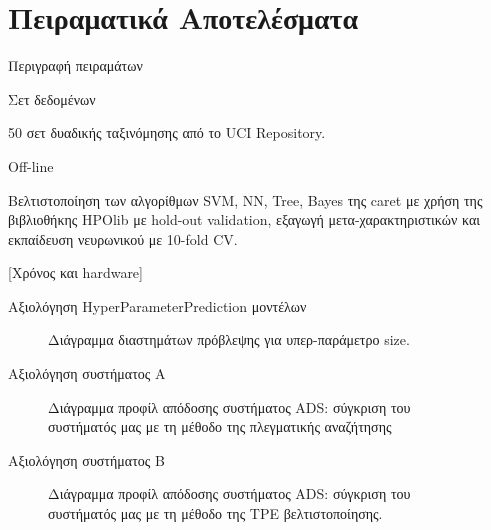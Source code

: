 \documentclass{beamer}
\begin{document}
   \section{Πειραματικά Αποτελέσματα}
  \begin{frame}{Περιγραφή πειραμάτων}
  	\begin{minipage}[t]{.3\textwidth}  		
  		Σετ δεδομένων
  		\vspace{4ex}
  	\end{minipage}%
  	\begin{minipage}[t]{.6\textwidth}
  		50 σετ δυαδικής ταξινόμησης από το UCI Repository.  		  	
  		\vspace{4ex}
  	\end{minipage}
  	\begin{minipage}[t]{.3\textwidth}  		
  		Off-line
  		\vspace{4ex}
  	\end{minipage}%
  	\begin{minipage}[t]{.6\textwidth}
  		Βελτιστοποίηση των αλγορίθμων SVM, NN, Tree, Bayes της caret με χρήση της βιβλιοθήκης HPOlib με hold-out validation, εξαγωγή μετα-χαρακτηριστικών και εκπαίδευση νευρωνικού με 10-fold CV.
  		
  		
  		[Χρόνος και hardware]
  		\vspace{4ex} 
  	\end{minipage} 
  \end{frame}
  \begin{frame}{Αξιολόγηση HyperParameterPrediction μοντέλων} 
  	\begin{figure}[!htb]
  		\scalebox{0.5}{
  			}
  		\caption{ \small Διάγραμμα διαστημάτων πρόβλεψης για υπερ-παράμετρο size.}
  	\end{figure}
  \end{frame}
  \begin{frame}{Αξιολόγηση συστήματος A} 
  	\begin{figure}[!htb]
  		\scalebox{0.5}{
  			}
  		\caption{\small Διάγραμμα προφίλ απόδοσης συστήματος ADS: σύγκριση του συστήματός μας με τη μέθοδο της πλεγματικής αναζήτησης}
  	\end{figure}
  \end{frame}
    \begin{frame}{Αξιολόγηση συστήματος Β} 
    	\begin{figure}[!htb]
    		\scalebox{0.5}{
    			}
    		\caption{ \small Διάγραμμα προφίλ απόδοσης συστήματος ADS: σύγκριση του συστήματός μας με τη μέθοδο της ΤPE βελτιστοποίησης.}
    	\end{figure}
    \end{frame}
\end{document}
